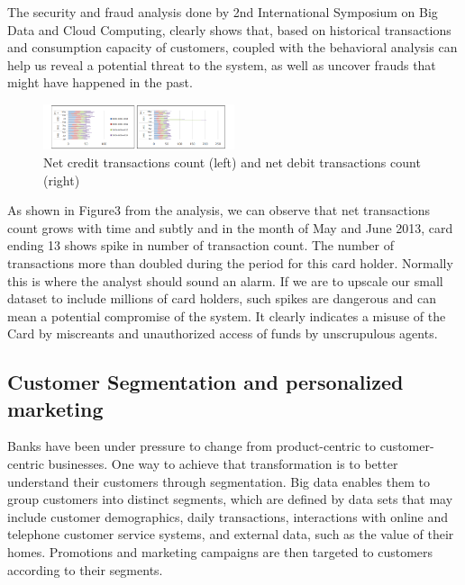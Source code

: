 \documentclass[sigconf]{acmart}
\begin{document}
The security and fraud analysis done by 2nd International Symposium on Big Data and Cloud Computing, clearly shows that, based on historical transactions and consumption capacity of customers, coupled with the behavioral analysis can help us reveal a potential threat to the system, as well as uncover frauds that might have happened in the past\cite{bigdata-banking}. 

\begin{figure}
  \centering
  \includegraphics[width=0.5\textwidth]{images/Figure3.png}
  \caption{Net credit transactions count (left) and net debit transactions count (right) 
  \cite{bigdata-banking}}
  \label{fig:Figure3} 
\end{figure}

As shown in Figure3 from the analysis, we can observe that net transactions count grows with time and subtly and in the month of May and June 2013, card ending 13 shows spike in number of transaction count. The number of transactions more than doubled during the period for this card holder. Normally this is where the analyst should sound an alarm. If we are to upscale our small dataset to include millions of card holders, such spikes are dangerous and can mean a potential compromise of the system. It clearly indicates a misuse of the Card by miscreants and unauthorized access of funds by unscrupulous agents.



\subsection{Customer Segmentation and personalized marketing}

Banks have been under pressure to change from product-centric to customer-centric businesses. One way to achieve that transformation is to better understand their customers through segmentation. Big data enables them to group customers into distinct segments, which are defined by data sets that may include customer demographics, daily transactions, interactions with online and telephone customer service systems, and external data, such as the value of their homes. Promotions and marketing campaigns are then targeted to customers according to their segments\cite{5-big-data-use-cases-in-banking-and-financial-services}.
\end{document}
